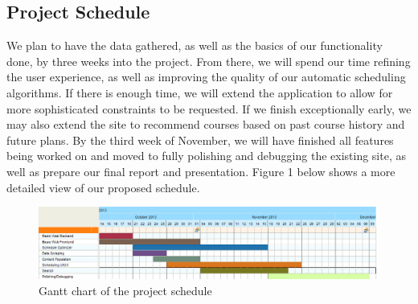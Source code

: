\subsection{Project Schedule}
We plan to have the data gathered, as well as the basics of our functionality done,
by three weeks into the project. From there, we will spend our time refining the user
experience, as well as improving the quality of our automatic scheduling algorithms. 
If there is enough time, we will extend the application to allow for more sophisticated
constraints to be requested. If we finish exceptionally early, we may also extend the
site to recommend courses based on past course history and future plans.
By the third week of November, we will have finished all features being worked on and
moved to fully polishing and debugging the existing site, as well as prepare our
final report and presentation.
Figure 1 below shows a more detailed view of our proposed schedule.
\begin{figure}[h!]
  \centering
  \includegraphics[width=\textwidth]{gantt.png}
  \caption{Gantt chart of the project schedule}
\end{figure}